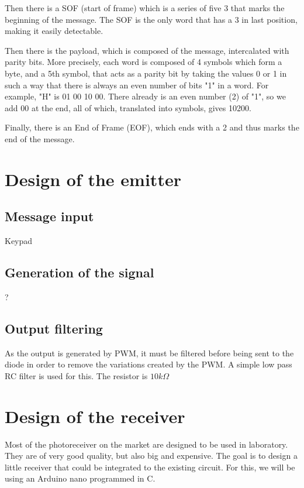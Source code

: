 \documentclass[12pt]{report}
\begin{document}
Then there is a SOF (start of frame) which is a series of five 3 that marks the beginning of the message. The SOF is the only word that has a 3 in last position, making it easily detectable.

Then there is the payload, which is composed of the message, intercalated with parity bits. More precisely, each word is composed of 4 symbols which form a byte, and a 5th symbol, that acts as a parity bit by taking the values 0 or 1 in such a way that there is always an even number of bits "1" in a word.
For example, "H" is 01 00 10 00. There already is an even number (2) of "1", so we add 00 at the end, all of which, translated into symbols, gives 10200.

Finally, there is an End of Frame (EOF), which ends with a 2 and thus marks the end of the message.



\section{Design of the emitter}

\subsection{Message input}

Keypad

\subsection{Generation of the signal}

?

\subsection{Output filtering}

As the output is generated by PWM, it must be filtered before being sent to the diode in order to remove the variations created by the PWM. A simple low pass RC filter is used for this.
The resistor is $10k\Omega$



\section{Design of the receiver}

Most of the photoreceiver on the market are designed to be used in laboratory. They are of very good quality, but also big and expensive. The goal is to design a little receiver that could be integrated to the existing circuit.
For this, we will be using an Arduino nano programmed in C.
\end{document}
